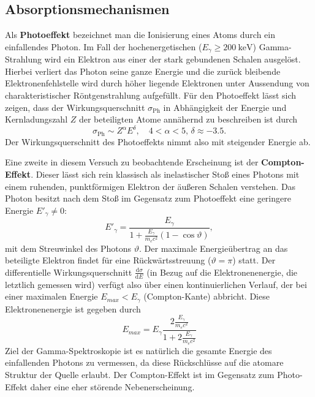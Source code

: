 \subsection{Absorptionsmechanismen}
Als \textbf{Photoeffekt} bezeichnet man die Ionisierung eines Atoms durch ein einfallendes Photon. Im Fall der
hochenergetischen ($E_\gamma \geq  \SI{200}{\kilo\electronvolt}$) Gamma-Strahlung wird ein Elektron aus einer der stark gebundenen Schalen
ausgelöst. Hierbei verliert das Photon seine ganze Energie und die zurück bleibende Elektronenfehlstelle wird durch
höher liegende Elektronen unter Aussendung von charakteristischer Röntgenstrahlung aufgefüllt. 
Für den Photoeffekt lässt sich zeigen, dass der Wirkungsquerschnitt $\sigma_{\text{Ph}}$ in Abhängigkeit der Energie und
Kernladungszahl $Z$ der beteiligten Atome annähernd zu beschreiben ist durch
\begin{equation}
    \sigma_{\text{Ph}} \sim Z^{\alpha} E^{\delta}, \quad 4 < \alpha < 5, \, \delta \approx -\num{3.5}.
    \label{eq:wirkungsquerschnitt_photo}
\end{equation}
Der Wirkungsquerschnitt des Photoeffekts nimmt also mit steigender Energie ab.

Eine zweite in diesem Versuch zu beobachtende Erscheinung ist der \textbf{Compton-Effekt}. Dieser lässt sich rein
klassisch als inelastischer Stoß eines Photons mit einem ruhenden, punktförmigen Elektron der äußeren Schalen verstehen.
Das Photon besitzt nach dem Stoß im Gegensatz zum Photoeffekt eine geringere Energie $E'_\gamma \neq 0$:
\begin{equation}
    {E'}_{\!\gamma} = \frac{E_\gamma}{1 + \frac{E_\gamma}{m_e c^2} \left(1 - \cos\vartheta \right)},
    \label{eq:rückstreu}
\end{equation}
mit dem Streuwinkel des Photons $\vartheta$. Der maximale Energieübertrag an das beteiligte Elektron findet für eine
Rückwärtsstreuung ($\vartheta = \pi$) statt. Der differentielle Wirkungsquerschnitt $\frac{\mathup{d}\sigma}{\mathup{d}E}$
(in Bezug auf die Elektronenenergie, die letztlich gemessen wird) verfügt also über einen kontinuierlichen Verlauf, der
bei einer maximalen Energie $E_{max} < E_\gamma$ (Compton-Kante) abbricht. Diese Elektronenenergie ist gegeben durch
\begin{equation}
    E_{max} = E_\gamma \frac{2\frac{E_\gamma}{m_ec^2}}{1 + 2\frac{E_\gamma}{m_ec^2}}
    \label{eq: comptonkante_energie}
\end{equation}
Ziel der Gamma-Spektroskopie ist es natürlich die
gesamte Energie des einfallenden Photons zu vermessen, da diese Rückschlüsse auf die atomare Struktur der Quelle
erlaubt. Der Compton-Effekt ist im Gegensatz zum Photo-Effekt daher eine eher störende Nebenerscheinung.

